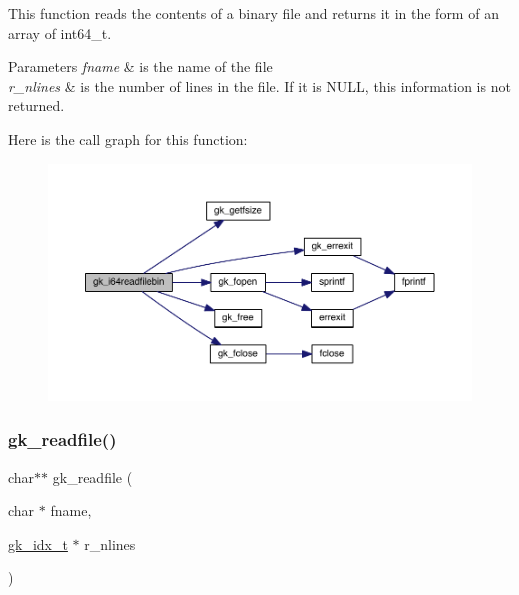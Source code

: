 This function reads the contents of a binary file and returns it in the form of an array of int64\+\_\+t. 
\begin{DoxyParams}{Parameters}
{\em fname} & is the name of the file \\
\hline
{\em r\+\_\+nlines} & is the number of lines in the file. If it is N\+U\+LL, this information is not returned. \\
\hline
\end{DoxyParams}
Here is the call graph for this function\+:\nopagebreak
\begin{figure}[H]
\begin{center}
\leavevmode
\includegraphics[width=350pt]{a00855_aca460764497638a612f886a089662416_cgraph}
\end{center}
\end{figure}
\mbox{\label{a00855_ad13e689608e193482a6f30b1ade87814}} 
\subsubsection{\texorpdfstring{gk\+\_\+readfile()}{gk\_readfile()}}
{\footnotesize\ttfamily char$\ast$$\ast$ gk\+\_\+readfile (\begin{DoxyParamCaption}\item[{char $\ast$}]{fname,  }\item[{\hyperlink{a00083_a899f9d8c47b1ca0c2fead41097f4bde2}{gk\+\_\+idx\+\_\+t} $\ast$}]{r\+\_\+nlines }\end{DoxyParamCaption})}

